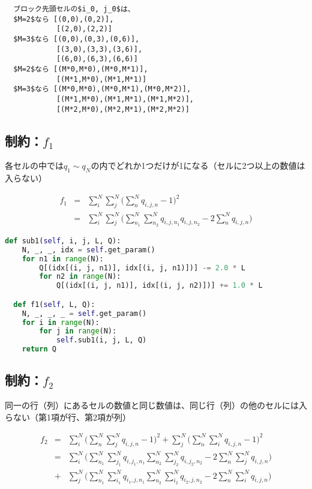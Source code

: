 \documentclass[uplatex,dvipdfmx,a4paper,11pt,oneside,openany]{jsbook}
\begin{document}
\begin{verbatim}
  ブロック先頭セルの$i_0, j_0$は、
  $M=2$なら [(0,0),(0,2)],
            [(2,0),(2,2)]
  $M=3$なら [(0,0),(0,3),(0,6)],
            [(3,0),(3,3),(3,6)],
            [(6,0),(6,3),(6,6)]
  $M=2$なら [(M*0,M*0),(M*0,M*1)],
            [(M*1,M*0),(M*1,M*1)]
  $M=3$なら [(M*0,M*0),(M*0,M*1),(M*0,M*2)],
            [(M*1,M*0),(M*1,M*1),(M*1,M*2)],
            [(M*2,M*0),(M*2,M*1),(M*2,M*2)]
\end{verbatim}

\subsection{制約：$f_1$}

各セルの中では$q_1\sim q_N$の内でどれか1つだけが1になる（セルに2つ以上の数値は入らない）

\begin{eqnarray*}
  f_1 &=& \sum_i^N\sum_j^N\bigg(\sum_n^N q_{i,j,n} - 1\bigg)^2\\
  &=& \sum_i^N\sum_j^N\bigg(\sum_{n_1}^N\sum_{n_2}^N q_{i,j,n_1}q_{i,j,n_2} -2\sum_n^N q_{i,j,n} \bigg)
\end{eqnarray*}

\begin{lstlisting}[language=Python]
  def sub1(self, i, j, L, Q):
    N, _, _, idx = self.get_param()
    for n1 in range(N):
        Q[(idx[(i, j, n1)], idx[(i, j, n1)])] -= 2.0 * L
        for n2 in range(N):
            Q[(idx[(i, j, n1)], idx[(i, j, n2)])] += 1.0 * L

  def f1(self, L, Q):
    N, _, _, _ = self.get_param()
    for i in range(N):
        for j in range(N):
            self.sub1(i, j, L, Q)
    return Q
\end{lstlisting}

\subsection{制約：$f_2$}

同一の行（列）にあるセルの数値と同じ数値は、同じ行（列）の他のセルには入らない（第1項が行、第2項が列）

\begin{eqnarray*}
  f_2 &=& \sum_i^N\bigg(\sum_n^N\sum_j^N q_{i,j,n} - 1\bigg)^2 + \sum_j^N\bigg(\sum_n^N\sum_i^N q_{i,j,n} - 1\bigg)^2\\
  &=& \sum_i^N\bigg(\sum_{n_1}^N\sum_{j_1}^Nq_{i,j_1,n_1}\sum_{n_2}^N\sum_{j_2}^Nq_{i,j_2,n_2} - 2\sum_n^N\sum_j^N q_{i,j,n}\bigg)\\
   &+& \sum_j^N\bigg(\sum_{n_1}^N\sum_{i_1}^Nq_{i_1,j,n_1}\sum_{n_2}^N\sum_{i_2}^Nq_{i_2,j,n_2} - 2\sum_n^N\sum_i^N q_{i,j,n}\bigg)
\end{eqnarray*}
\end{document}
